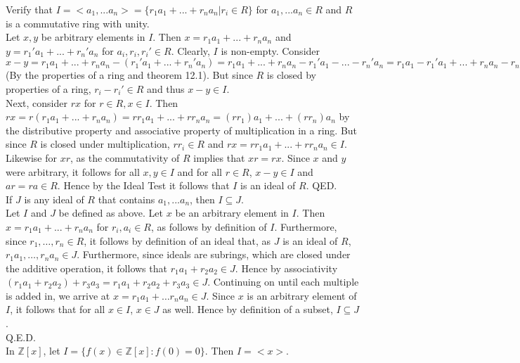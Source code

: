\documentclass{article}
\newcommand{\Z}{\mathbb{Z}}
\begin{document}
 Verify that $I=<a_1, ... a_n>=\{r_1a_1+...+r_na_n|r_i \in R\}$ for $a_1, ... a_n \in R$ and $R$ is a commutative ring with unity. \\

 Let $x, y$ be arbitrary elements in $I$. Then $x=r_1a_1+...+r_na_n$ and $y=r_1'a_1+...+r_n'a_n$ for $a_i, r_i, r_i' \in R$. Clearly, $I$ is non-empty. Consider $x-y=r_1a_1+...+r_na_n-(r_1'a_1+...+r_n'a_n)=r_1a_1+...+r_na_n-r_1'a_1-...-r_n'a_n=r_1a_1-r_1'a_1+...+r_na_n-r_n'a_n=(r_1-r_1')a_1+...+(r_n-r_n')a_n$ (By the properties of a ring and theorem 12.1). But since $R$ is closed by properties of a ring, $r_i-r_i' \in R$ and thus $x-y \in I$. \\
Next, consider $rx$ for $r \in R, x \in I$. Then $rx=r(r_1a_1+...+r_na_n)=rr_1a_1+...+rr_na_n = (rr_1)a_1+...+(rr_n)a_n$ by the distributive property and associative property of multiplication in a ring. But since $R$ is closed under multiplication, $rr_i \in R$ and $rx = rr_1a_1+...+rr_na_n \in I$. Likewise for $xr$, as the commutativity of $R$ implies that $xr = rx$. Since $x$ and $y$ were arbitrary, it follows for all $x,y\in I$ and for all $r\in R$, $x-y \in I$ and $ar =ra \in R$. Hence by the Ideal Test it follows that $I$ is an ideal of $R$. QED. \\

 If $J$ is any ideal of $R$ that contains $a_1, ... a_n$, then $I \subseteq J$. \\

 Let $I$ and $J$ be defined as above. Let $x$ be an arbitrary element in $I$. Then $x=r_1a_1+...+r_na_n$ for $r_i, a_i \in R$, as follows by definition of $I$. Furthermore, since $r_1,\dots,r_n\in R$, it follows by definition of an ideal that, as $J$ is an ideal of $R$, $r_1a_1,\dots,r_na_n\in J$. Furthermore, since ideals are subrings, which are closed under the additive operation, it follows that $r_1a_1 + r_2a_2 \in J$. Hence by associativity $(r_1a_1 + r_2a_2) + r_3a_3 = r_1a_1+ r_2a_2 + r_3a_3 \in J$. Continuing on until each multiple is added in, we arrive at $x = r_1a_1 + \dots r_n a_n \in J$. Since $x$ is an arbitrary element of $I$, it follows that for all $x\in I$, $x\in J$ as well. Hence by definition of a subset, $I\subseteq J$.\\
Q.E.D.\\

 In $\Z[x]$, let $I = \{f(x)\in \Z[x] : f(0) =0\}$. Then $I = <x>$.\\
\end{document}
